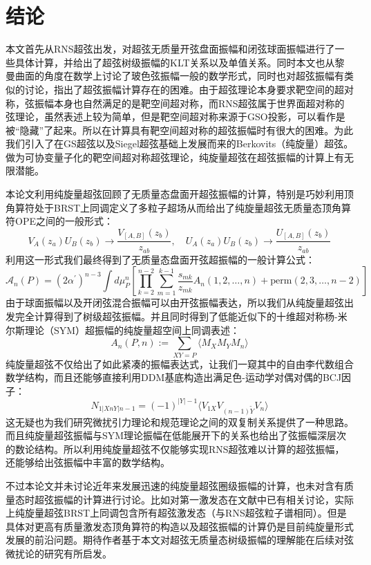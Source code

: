 \chapter{结论}

本文首先从RNS超弦出发，对超弦无质量开弦盘面振幅和闭弦球面振幅进行了一些具体计算，并给出了超弦树级振幅的KLT关系以及单值关系。同时本文也从黎曼曲面的角度在数学上讨论了玻色弦振幅一般的数学形式，同时也对超弦振幅有类似的讨论，指出了超弦振幅计算存在的困难。由于超弦理论本身要求靶空间的超对称，弦振幅本身也自然满足的是靶空间超对称，而RNS超弦属于世界面超对称的弦理论，虽然表述上较为简单，但是靶空间超对称来源于GSO投影，可以看作是被“隐藏”了起来。所以在计算具有靶空间超对称的超弦振幅时有很大的困难。为此我们引入了在GS超弦以及Siegel超弦基础上发展而来的Berkovits（纯旋量）超弦。做为可协变量子化的靶空间超对称超弦理论，纯旋量超弦在超弦振幅的计算上有无限潜能。

本论文利用纯旋量超弦回顾了无质量态盘面开超弦振幅的计算，特别是巧妙利用顶角算符处于BRST上同调定义了多粒子超场从而给出了纯旋量超弦无质量态顶角算符OPE之间的一般形式：
\begin{equation}
	V_A(z_a)U_B(z_b) \to \frac{V_{[A,B]}(z_b)}{z_{ab}}, \quad U_A(z_a)U_B(z_b) \to \frac{U_{[A,B]}(z_b)}{z_{ab}}
\end{equation}
利用这一形式我们最终得到了无质量态盘面开弦超振幅的一般计算公式：
\begin{equation}
		\mathcal{A}_n(P)=(2\alpha^{\prime})^{n-3}\int d\mu_P^n\left[\prod_{k=2}^{n-2}\sum_{m=1}^{k-1}\frac{s_{mk}}{z_{mk}}A_n(1,2,\ldots,n)+\mathrm{perm}(2,3,\ldots,n-2)\right]
\end{equation}
由于球面振幅以及开闭弦混合振幅可以由开弦振幅表达，所以我们从纯旋量超弦出发完全计算得到了树级超弦振幅。并且同时得到了低能近似下的十维超对称杨-米尔斯理论（SYM）超振幅的纯旋量超空间上同调表述：
\begin{equation}
	A_n(P,n):=\sum_{XY=P}\langle M_XM_YM_n\rangle
\end{equation}
纯旋量超弦不仅给出了如此紧凑的振幅表达式，让我们一窥其中的自由李代数组合数学结构，而且还能够直接利用DDM基底构造出满足色-运动学对偶对偶的BCJ因子：
\begin{equation}
	N_{1|XnY|n-1}=(-1)^{|Y|-1}\langle V_{1X}V_{(n-1)\tilde{Y}}V_{n}\rangle
\end{equation}
这无疑也为我们研究微扰引力理论和规范理论之间的双复制关系提供了一种思路。而且纯旋量超弦振幅与SYM理论振幅在低能展开下的关系也给出了弦振幅深层次的数论结构。所以利用纯旋量超弦不仅能够实现RNS超弦难以计算的超弦振幅，还能够给出弦振幅中丰富的数学结构。

不过本论文并未讨论近年来发展迅速的纯旋量超弦圈级振幅的计算\cite{gzq}，也未对含有质量态时超弦振幅的计算进行讨论。比如对第一激发态在文献\cite{Berkovits:2002qx,Chakrabarti:2018mqd,Chakrabarti:2018bah}中已有相关讨论，实际上纯旋量超弦BRST上同调包含所有超弦激发态（与RNS超弦粒子谱相同）\cite{Berkovits:2000nn,Berkovits:2001mx,Aisaka:2008vw}。但是具体对更高有质量激发态顶角算符的构造以及超弦振幅的计算仍是目前纯旋量形式发展的前沿问题。期待作者基于本文对超弦无质量态树级振幅的理解能在后续对弦微扰论的研究有所启发。